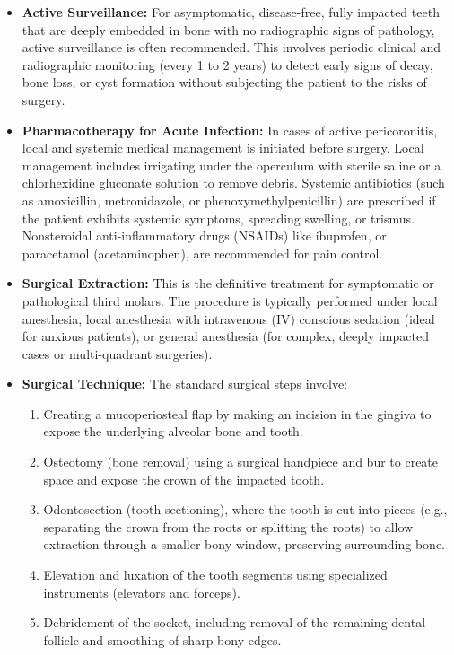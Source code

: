 \begin{itemize}
    \item \textbf{Active Surveillance:} For asymptomatic, disease-free, fully impacted teeth that are deeply embedded in bone with no radiographic signs of pathology, active surveillance is often recommended. This involves periodic clinical and radiographic monitoring (every 1 to 2 years) to detect early signs of decay, bone loss, or cyst formation without subjecting the patient to the risks of surgery.
    \item \textbf{Pharmacotherapy for Acute Infection:} In cases of active pericoronitis, local and systemic medical management is initiated before surgery. Local management includes irrigating under the operculum with sterile saline or a chlorhexidine gluconate solution to remove debris. Systemic antibiotics (such as amoxicillin, metronidazole, or phenoxymethylpenicillin) are prescribed if the patient exhibits systemic symptoms, spreading swelling, or trismus. Nonsteroidal anti-inflammatory drugs (NSAIDs) like ibuprofen, or paracetamol (acetaminophen), are recommended for pain control.
    \item \textbf{Surgical Extraction:} This is the definitive treatment for symptomatic or pathological third molars. The procedure is typically performed under local anesthesia, local anesthesia with intravenous (IV) conscious sedation (ideal for anxious patients), or general anesthesia (for complex, deeply impacted cases or multi-quadrant surgeries).
    \item \textbf{Surgical Technique:} The standard surgical steps involve:
    \begin{enumerate}
        \item Creating a mucoperiosteal flap by making an incision in the gingiva to expose the underlying alveolar bone and tooth.
        \item Osteotomy (bone removal) using a surgical handpiece and bur to create space and expose the crown of the impacted tooth.
        \item Odontosection (tooth sectioning), where the tooth is cut into pieces (e.g., separating the crown from the roots or splitting the roots) to allow extraction through a smaller bony window, preserving surrounding bone.
        \item Elevation and luxation of the tooth segments using specialized instruments (elevators and forceps).
        \item Debridement of the socket, including removal of the remaining dental follicle and smoothing of sharp bony edges.

\end{enumerate}
\end{itemize}
